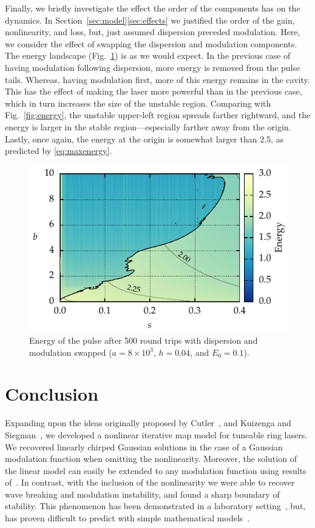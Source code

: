 \documentclass[9pt,twocolumn,twoside]{osajnl}
\begin{document}
Finally, we briefly investigate the effect the order of the components has on the dynamics. In Section~\ref{sec:model}\ref{sec:effects} we justified the order of the gain, nonlinearity, and loss, but, just assumed dispersion preceded modulation. Here, we consider the effect of swapping the dispersion and modulation components. The energy landscape (Fig.~\ref{fig:energyswitch}) is as we would expect. In the previous case of having modulation following dispersion, more energy is removed from the pulse tails. Whereas, having modulation first, more of this energy remains in the cavity. This has the effect of making the laser more powerful than in the previous case, which in turn increases the size of the unstable region. Comparing with Fig.~\ref{fig:energy}, the unstable upper-left region spreads farther rightward, and the energy is larger in the stable region---especially farther away from the origin. Lastly, once again, the energy at the origin is somewhat larger than 2.5, as predicted by \eqref{eq:maxenergy}.

\begin{figure}[tbp]
	\centering
	\includegraphics{Figures/ParamSpaceEnergySwitch}
	\caption{Energy of the pulse after 500 round trips with dispersion and modulation swapped ($a = 8 \times 10^3$, $h = 0.04$, and $E_0 = 0.1$).}
	\label{fig:energyswitch}
\end{figure}

\section{Conclusion}
\label{sec:conclusion}
Expanding upon the ideas originally proposed by Cutler~\cite{cutler1955}, and Kuizenga and Siegman~\cite{kuizenga1970, kuizenga1970a, siegman1969}, we developed a nonlinear iterative map model for tuneable ring lasers. We recovered linearly chirped Gaussian solutions in the case of a Gaussian modulation function when omitting the nonlinearity. Moreover, the solution of the linear model can easily be extended to any modulation function using results of~\cite{calcaterra2008a}. In contrast, with the inclusion of the nonlinearity we were able to recover wave breaking and modulation instability, and found a sharp boundary of stability. This phenomenon has been demonstrated in a laboratory setting~\cite{agrawal2013, anderson1992, finot2008, rothenberg1989b, tomlinson1985}, but, has proven difficult to predict with simple mathematical models~\cite{meng2020}.
\end{document}

